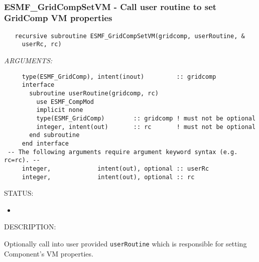 \mbox{}\hrulefill\ 
 
\subsubsection [ESMF\_GridCompSetVM] {ESMF\_GridCompSetVM - Call user routine to set GridComp VM properties}


  
\begin{verbatim}   recursive subroutine ESMF_GridCompSetVM(gridcomp, userRoutine, &
     userRc, rc)\end{verbatim}{\em ARGUMENTS:}
\begin{verbatim}     type(ESMF_GridComp), intent(inout)         :: gridcomp
     interface
       subroutine userRoutine(gridcomp, rc)
         use ESMF_CompMod
         implicit none
         type(ESMF_GridComp)        :: gridcomp ! must not be optional
         integer, intent(out)       :: rc       ! must not be optional
       end subroutine
     end interface
 -- The following arguments require argument keyword syntax (e.g. rc=rc). --
     integer,             intent(out), optional :: userRc
     integer,             intent(out), optional :: rc\end{verbatim}
{\sf STATUS:}
   \begin{itemize}
   \item{}
   \end{itemize}
  
{\sf DESCRIPTION:\\ }


   Optionally call into user provided {\tt userRoutine} which is responsible
   for setting Component's VM properties.
  
